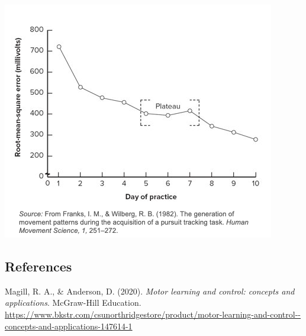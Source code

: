 \documentclass[
  letterpaper,
  DIV=11,
  numbers=noendperiod]{scrartcl}
\newlength{\cslhangindent}
\newlength{\cslentryspacingunit} %
\newenvironment{CSLReferences}[2] %
 {%
  \setlength{\parindent}{0pt}
  \ifodd #1
  \let\oldpar\par
  \def\par{\hangindent=\cslhangindent\oldpar}
  \fi
  \setlength{\parskip}{#2\cslentryspacingunit}
 }%
 {}
\begin{document}
\includegraphics{images/Screenshot 2023-09-11 at 11.47.44 AM-01.png}

\hypertarget{section}{%
\subsection{\hspace{0pt}}\label{section}}

\hypertarget{references}{%
\subsection*{References}\label{references}}

\hypertarget{refs}{}
\begin{CSLReferences}{1}{0}
\leavevmode{}%
Magill, R. A., \& Anderson, D. (2020). \emph{Motor learning and control:
concepts and applications}. McGraw-Hill Education.
\url{https://www.bkstr.com/csunorthridgestore/product/motor-learning-and-control--concepts-and-applications-147614-1}

\end{CSLReferences}
\end{document}
